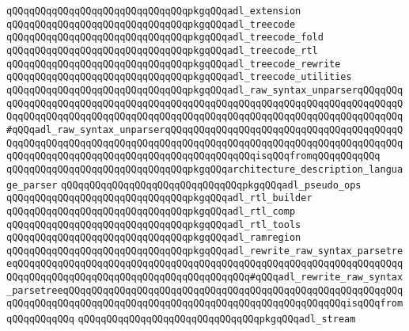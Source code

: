 \verb|qQQqqQQqqQQqqQQqqQQqqQQqqQQqqQQqpkgqQQqadl_extension|\newline
\verb|qQQqqQQqqQQqqQQqqQQqqQQqqQQqqQQqpkgqQQqadl_treecode|\newline
\verb|qQQqqQQqqQQqqQQqqQQqqQQqqQQqqQQqpkgqQQqadl_treecode_fold|\newline
\verb|qQQqqQQqqQQqqQQqqQQqqQQqqQQqqQQqpkgqQQqadl_treecode_rtl|\newline
\verb|qQQqqQQqqQQqqQQqqQQqqQQqqQQqqQQqpkgqQQqadl_treecode_rewrite|\newline
\verb|qQQqqQQqqQQqqQQqqQQqqQQqqQQqqQQqpkgqQQqadl_treecode_utilities|\newline
\verb|qQQqqQQqqQQqqQQqqQQqqQQqqQQqqQQqpkgqQQqadl_raw_syntax_unparserqQQqqQQqqQQqqQQqqQQqqQQqqQQqqQQqqQQqqQQqqQQqqQQqqQQqqQQqqQQqqQQqqQQqqQQqqQQqqQQqqQQqqQQqqQQqqQQqqQQqqQQqqQQqqQQqqQQqqQQqqQQqqQQqqQQqqQQqqQQqqQQqqQQq#qQQqadl_raw_syntax_unparserqQQqqQQqqQQqqQQqqQQqqQQqqQQqqQQqqQQqqQQqqQQqqQQqqQQqqQQqqQQqqQQqqQQqqQQqqQQqqQQqqQQqqQQqqQQqqQQqqQQqqQQqqQQqqQQqqQQqqQQqqQQqqQQqqQQqqQQqqQQqqQQqqQQqqQQqqQQqisqQQqfromqQQqqQQqqQQq|\newline
\verb|qQQqqQQqqQQqqQQqqQQqqQQqqQQqqQQqpkgqQQqarchitecture_description_language_parser|\newline
\verb|qQQqqQQqqQQqqQQqqQQqqQQqqQQqqQQqpkgqQQqadl_pseudo_ops|\newline
\verb|qQQqqQQqqQQqqQQqqQQqqQQqqQQqqQQqpkgqQQqadl_rtl_builder|\newline
\verb|qQQqqQQqqQQqqQQqqQQqqQQqqQQqqQQqpkgqQQqadl_rtl_comp|\newline
\verb|qQQqqQQqqQQqqQQqqQQqqQQqqQQqqQQqpkgqQQqadl_rtl_tools|\newline
\verb|qQQqqQQqqQQqqQQqqQQqqQQqqQQqqQQqpkgqQQqadl_ramregion|\newline
\verb|qQQqqQQqqQQqqQQqqQQqqQQqqQQqqQQqpkgqQQqadl_rewrite_raw_syntax_parsetreeqQQqqQQqqQQqqQQqqQQqqQQqqQQqqQQqqQQqqQQqqQQqqQQqqQQqqQQqqQQqqQQqqQQqqQQqqQQqqQQqqQQqqQQqqQQqqQQqqQQqqQQqqQQqqQQq#qQQqadl_rewrite_raw_syntax_parsetreeqQQqqQQqqQQqqQQqqQQqqQQqqQQqqQQqqQQqqQQqqQQqqQQqqQQqqQQqqQQqqQQqqQQqqQQqqQQqqQQqqQQqqQQqqQQqqQQqqQQqqQQqqQQqqQQqqQQqqQQqisqQQqfromqQQqqQQqqQQq|\newline
\verb|qQQqqQQqqQQqqQQqqQQqqQQqqQQqqQQqpkgqQQqadl_stream|\newline
